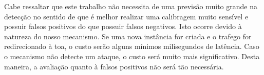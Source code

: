 Cabe ressaltar que este trabalho não necessita de uma previsão muito grande na detecção no sentido de que é melhor realizar uma calibragem muito sensível e possuir falsos positivos do que possuir falsos negativos. Isto ocorre devido à natureza do nosso mecanismo. Se uma nova instância for criada e o trafego for redirecionado à toa, o custo serão alguns mínimos milisegundos de latência. Caso o mecanismo não detecte um ataque, o custo será muito mais significativo. Desta maneira, a avaliação quanto à falsos positivos não será tão necessária. %

